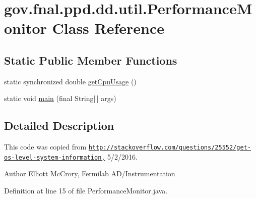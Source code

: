 \hypertarget{classgov_1_1fnal_1_1ppd_1_1dd_1_1util_1_1PerformanceMonitor}{\section{gov.\-fnal.\-ppd.\-dd.\-util.\-Performance\-Monitor Class Reference}
\label{classgov_1_1fnal_1_1ppd_1_1dd_1_1util_1_1PerformanceMonitor}
}
\subsection*{Static Public Member Functions}
\begin{DoxyCompactItemize}
\item 
static synchronized double \hyperlink{classgov_1_1fnal_1_1ppd_1_1dd_1_1util_1_1PerformanceMonitor_a1d535cff921ba7d0e2778342d796c905}{get\-Cpu\-Usage} ()
\item 
static void \hyperlink{classgov_1_1fnal_1_1ppd_1_1dd_1_1util_1_1PerformanceMonitor_ad4cd84473c2b346ee8714b2f5d1055ce}{main} (final String\mbox{[}$\,$\mbox{]} args)
\end{DoxyCompactItemize}


\subsection{Detailed Description}
This code was copied from \href{http://stackoverflow.com/questions/25552/get-os-level-system-information,}{\tt http\-://stackoverflow.\-com/questions/25552/get-\/os-\/level-\/system-\/information,} 5/2/2016.

\begin{DoxyAuthor}{Author}
Elliott Mc\-Crory, Fermilab A\-D/\-Instrumentation 
\end{DoxyAuthor}


Definition at line 15 of file Performance\-Monitor.\-java.




